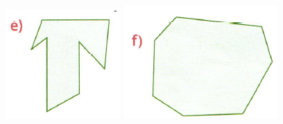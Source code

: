 \documentclass[a4paper,14pt]{article}
\begin{document}
\begin{multicols}{2}
\begin{enumerate}
			\includegraphics[width=1\linewidth]{6FMA88_imagens/imagem5}
			\includegraphics[width=1\linewidth]{6FMA88_imagens/imagem6}

\end{enumerate}
\end{multicols}
\end{document}
